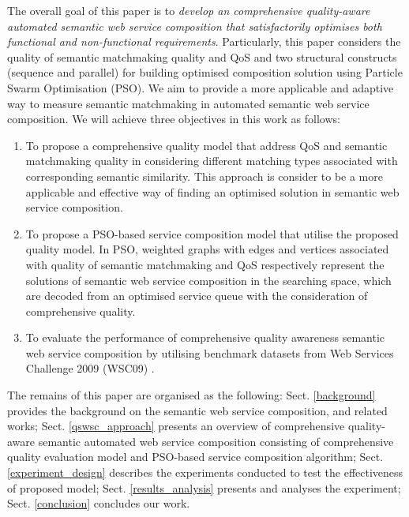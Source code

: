 \documentclass{llncs}
\begin{document}
The overall goal of this paper is to \textit{develop an comprehensive quality-aware automated semantic web service composition that satisfactorily optimises both functional and non-functional requirements}. Particularly, this paper considers the quality of semantic matchmaking quality and QoS and two structural constructs (sequence and parallel) for building optimised composition solution using Particle Swarm Optimisation (PSO). We aim to provide a more applicable and adaptive way to measure semantic matchmaking in automated semantic web service composition. We will achieve three objectives in this work as follows:

\begin{enumerate}
 \item To propose a comprehensive quality model that address QoS and semantic matchmaking quality in considering different matching types associated with corresponding semantic similarity. This approach is consider to be a more applicable and effective way of finding an optimised solution in semantic web service composition.
  
 \item To propose a PSO-based service composition model that utilise the proposed quality model. In PSO, weighted graphs with edges and vertices associated with quality of semantic matchmaking and QoS respectively represent the solutions of semantic web service composition in the searching space, which are decoded from an optimised service queue with the consideration of comprehensive quality.
  
 \item To evaluate the performance of comprehensive quality awareness semantic web service composition by utilising benchmark datasets from Web Services Challenge 2009 (WSC09) \cite{kona2009wsc}.
\end{enumerate}

The remains of this paper are organised as the following: Sect. \ref{background} provides the background on the semantic web service composition, and related works; Sect. \ref{qswsc_approach} presents an overview of comprehensive quality-aware semantic automated web service composition consisting of comprehensive quality evaluation model and PSO-based service composition algorithm; Sect. \ref{experiment_design} describes the experiments conducted to test the effectiveness of proposed model; Sect. \ref{results_analysis} presents and analyses the experiment; Sect. \ref{conclusion} concludes our work.
\end{document}
